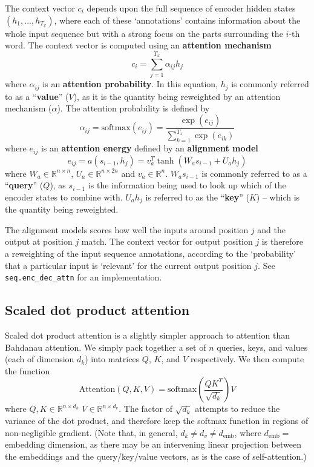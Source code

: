 \documentclass[11pt]{article}
\numberwithin{equation}{section}
\begin{document}
The context vector $c_i$ depends upon the full sequence of encoder hidden states $(h_1, ..., h_{T_x})$, where each of these `annotations' contains information about the whole input sequence but with a strong focus on the parts surrounding the $i$-th word. The context vector is computed using an \textbf{attention mechanism}
\begin{equation}
c_i = \sum_{j=1}^{T_x} \alpha_{ij} h_j \label{eq:bah-attn-mech}
\end{equation}
where $\alpha_{ij}$ is an \textbf{attention probability}. In this equation, $h_j$ is commonly referred to as a ``\textbf{value}'' ($V$), as it is the quantity being reweighted by an attention mechanism ($\alpha$). The attention probability is defined by
\begin{equation}
\alpha_{ij} = \text{softmax}\left( e_{ij} \right) = \frac{\exp(e_{ij})}{\sum_{k=1}^{T_x}\exp(e_{ik})}
\end{equation}
where $e_{ij}$ is an \textbf{attention energy} defined by an \textbf{alignment model}
\begin{equation}
e_{ij} = a(s_{i-1}, h_j) = v_a^T \tanh(W_a s_{i-1} + U_a h_j)
\end{equation}
where $W_a \in \mathbb{R}^{n \times n}$, $U_a \in \mathbb{R}^{n \times 2n}$ and $v_a \in \mathbb{R}^n$. $W_a s_{i-1}$ is commonly referred to as a ``\textbf{query}'' ($Q$), as $s_{i-1}$ is the information being used to look up which of the encoder states to combine with. $U_a h_j$ is referred to as the ``\textbf{key}'' ($K$) -- which is the quantity being reweighted.

The alignment models scores how well the inputs around position $j$ and the output at position $j$ match. The context vector for output position $j$ is therefore a reweighting of the input sequence annotations, according to the `probability' that a particular input is `relevant' for the current output position $j$. See \verb#seq.enc_dec_attn# for an implementation.

\newcommand{\demb}{d_{\text{emb}}}

\subsection{Scaled dot product attention} \label{sec:dp-attn}
Scaled dot product attention is a slightly simpler approach to attention than Bahdanau attention. We simply pack together a set of $n$ queries, keys, and values (each of dimension $d_k$) into matrices $Q$, $K$, and $V$ respectively. We then compute the function
\begin{equation}
\text{Attention}(Q, K, V) = \text{softmax}\left( \frac{QK^T}{\sqrt{d_k}} \right) V \label{eq:dot-prod-attn}
\end{equation}
where $Q, K \in \mathbb{R}^{n \times d_k}$ $V \in \mathbb{R}^{n \times d_v}$. The factor of $\sqrt{d_k}$ attempts to reduce the variance of the dot product, and therefore keep the softmax function in regions of non-negligible gradient. (Note that, in general, $d_k \neq d_v \neq \demb$, where $\demb=$ embedding dimension, as there may be an intervening linear projection between the embeddings and the query/key/value vectors, as is the case of self-attention.)
\end{document}

